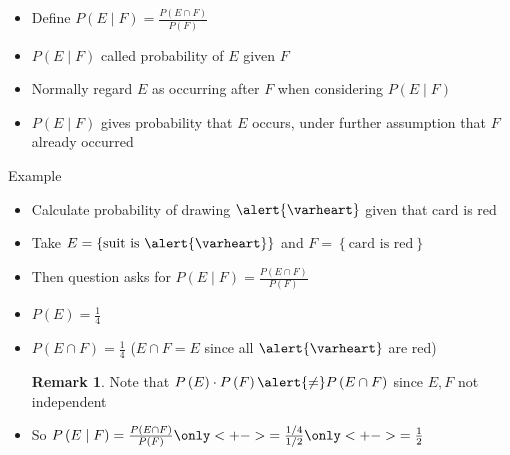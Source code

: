 \documentclass[handout]{beamer}
\theoremstyle{definition}
\newtheorem{remark}{Remark}
\begin{document}
\begin{frame}
\begin{definition}
\begin{itemize}
\item Define $P\left(E\mid F\right)
=\frac{P\left(E\cap F\right)}{P\left(F\right)}$
\item $P\left(E\mid F\right)$ called
\alert{probability of $E$ given $F$}
\end{itemize}
\end{definition}
\begin{itemize}
\item Normally regard $E$ as occurring
\alert{after} $F$ when considering $P\left(E\mid F\right)$
\item $P\left(E\mid F\right)$ gives probability that $E$ occurs,
under further assumption that $F$ already occurred
\end{itemize}
\end{frame}

\begin{frame}{Example}
\begin{itemize}
\item Calculate probability of drawing $\alert{\varheart}$ given
that card is red
\item Take $E=\left\{\text{suit is $\alert{\varheart}$}\right\}$
and $F=\left\{\text{card is red}\right\}$
\item Then question asks for $P\left(E\mid F\right)
=\frac{P\left(E\cap F\right)}{P\left(F\right)}$
\item $P\left(E\right)=\frac{1}{4}$\qquad
{}
\item $P\left(E\cap F\right)=\frac{1}{4}$\qquad
($E\cap F=E$ since all $\alert{\varheart}$ are red)
\begin{remark}
Note that $P\left(E\right)\cdot P\left(F\right)\alert{\ne}
P\left(E\cap F\right)$
since $E,F$ not independent
\end{remark}
\item So $P\left(E\mid F\right)
=\frac{P\left(E\cap F\right)}{P\left(F\right)}
\only<+->{=\frac{1/4}{1/2}}
\only<+->{=\frac{1}{2}}$
\end{itemize}
\end{frame}
\end{document}
